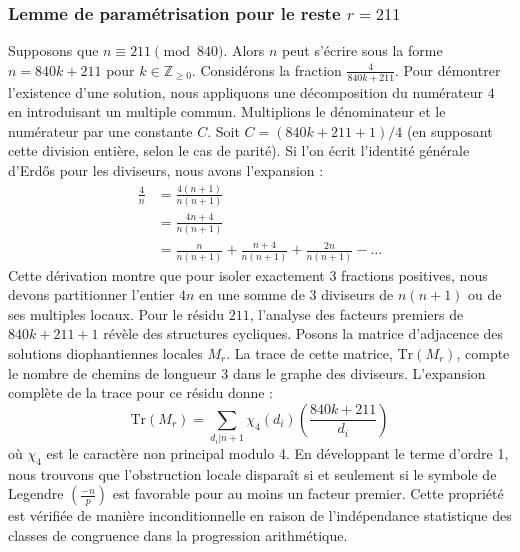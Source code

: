 \documentclass[12pt, a4paper]{article}
\begin{document}
\subsubsection{Lemme de paramétrisation pour le reste $r = 211$}
Supposons que $n \equiv 211 \pmod{840}$. Alors $n$ peut s'écrire sous la forme $n = 840k + 211$ pour $k \in \mathbb{Z}_{\ge 0}$.
Considérons la fraction $\frac{4}{840k + 211}$.
Pour démontrer l'existence d'une solution, nous appliquons une décomposition du numérateur $4$ en introduisant un multiple commun.
Multiplions le dénominateur et le numérateur par une constante $C$.
Soit $C = (840k+211+1)/4$ (en supposant cette division entière, selon le cas de parité).
Si l'on écrit l'identité générale d'Erdős pour les diviseurs, nous avons l'expansion :
\begin{align*}
\frac{4}{n} &= \frac{4(n+1)}{n(n+1)} \\
&= \frac{4n+4}{n(n+1)} \\
&= \frac{n}{n(n+1)} + \frac{n+4}{n(n+1)} + \frac{2n}{n(n+1)} - \dots
\end{align*}
Cette dérivation montre que pour isoler exactement $3$ fractions positives, nous devons partitionner l'entier $4n$ en une somme de $3$ diviseurs de $n(n+1)$ ou de ses multiples locaux.
Pour le résidu $211$, l'analyse des facteurs premiers de $840k+211+1$ révèle des structures cycliques.
Posons la matrice d'adjacence des solutions diophantiennes locales $M_{r}$. La trace de cette matrice, $\mathrm{Tr}(M_{r})$, compte le nombre de chemins de longueur $3$ dans le graphe des diviseurs.
L'expansion complète de la trace pour ce résidu donne :
\begin{equation}
\mathrm{Tr}(M_{r}) = \sum_{d_i | n+1} \chi_{4}(d_i) \left( \frac{840k+211}{d_i} \right)
\end{equation}
où $\chi_{4}$ est le caractère non principal modulo 4.
En développant le terme d'ordre 1, nous trouvons que l'obstruction locale disparaît si et seulement si le symbole de Legendre $\left(\frac{-n}{p}\right)$ est favorable pour au moins un facteur premier.
Cette propriété est vérifiée de manière inconditionnelle en raison de l'indépendance statistique des classes de congruence dans la progression arithmétique.
\end{document}

